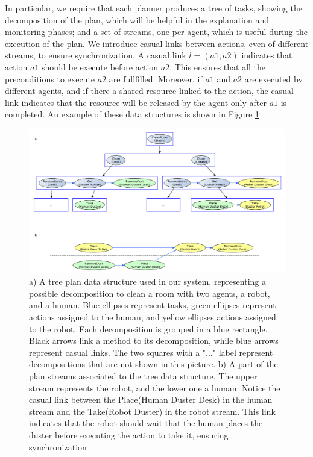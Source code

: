 In particular, we require that each planner produces a tree of tasks, showing the decomposition of the plan, which will be helpful in the explanation and monitoring phases; and a set of streams, one per agent, which is useful during the execution of the plan. We introduce casual links between actions, even of different streams, to ensure synchronization. A casual link $l=(a1,a2)$ indicates that action $a1$ should be execute before action $a2$. This ensures that all the preconditions to execute $a2$ are fullfilled. Moreover, if $a1$ and $a2$ are executed by different agents, and if there a shared resource linked to the action, the casual link indicates that the resource will be released by the agent only after $a1$ is completed. An example of these data structures is shown in Figure \ref{fig:plan_management-plan_structure}

\begin{figure}[ht!]
 \centering
  \includegraphics[scale=0.45]{img/plan_management/plan_data_example.pdf}
 \caption{a) A tree plan data structure used in our system, representing a possible decomposition to clean a room
 with two agents, a robot, and a human. Blue ellipses represent tasks, green ellipses represent
 actions assigned to the human, and yellow ellipses actions assigned to the robot. Each decomposition is grouped
 in a blue rectangle. Black arrows link a method to its decomposition, while blue arrows represent casual links. The two squares with a "..." label represent decompositions that are not shown in this picture.
 b) A part of the plan streams associated to the tree data structure. The upper stream represents the robot, and the lower one a human. Notice the casual link between the Place(Human Duster Desk) in the human stream and the Take(Robot Duster) in the robot stream. This link indicates that the robot should wait that the human places the duster before executing the action to take it, ensuring synchronization }
 \label{fig:plan_management-plan_structure}
 \end{figure}


